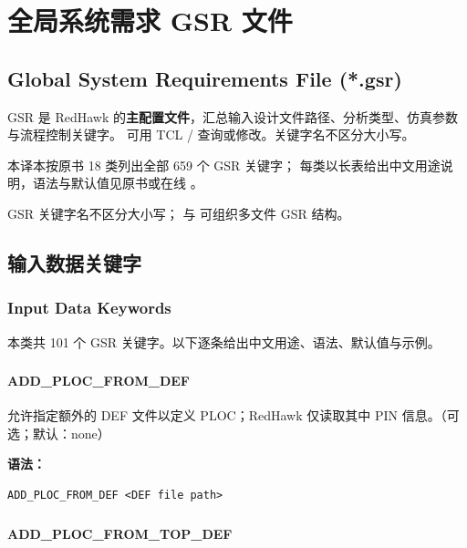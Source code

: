 \section{全局系统需求 GSR 文件}
\subsection*{Global System Requirements File (*.gsr)}

GSR 是 RedHawk 的\textbf{主配置文件}，汇总输入设计文件路径、分析类型、仿真参数与流程控制关键字。
可用 TCL / 查询或修改。关键字名不区分大小写。

本译本按原书 18 类列出全部 659 个 GSR 关键字；
每类以长表给出中文用途说明，语法与默认值见原书或在线 。

\begin{noteBox}
GSR 关键字名不区分大小写； 与  可组织多文件 GSR 结构。
\end{noteBox}

\subsection{输入数据关键字}
\subsubsection*{Input Data Keywords}

本类共 101 个 GSR 关键字。以下逐条给出中文用途、语法、默认值与示例。

\subsubsection{}
\paragraph*{ADD_PLOC_FROM_DEF}

允许指定额外的 DEF 文件以定义 PLOC；RedHawk 仅读取其中 PIN 信息。（可选；默认：none）

\textbf{语法：}
\begin{lstlisting}
ADD_PLOC_FROM_DEF <DEF file path>
\end{lstlisting}

\subsubsection{}
\paragraph*{ADD_PLOC_FROM_TOP_DEF}

